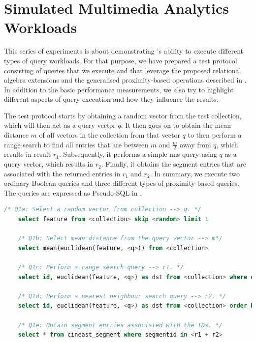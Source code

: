 \section{Simulated Multimedia Analytics Workloads}
\label{section:evaluation_analytics}

This series of experiments is about demonstrating \cottontail{}'s ability to execute different types of query workloads. For that purpose, we have prepared a test protocol consisting of queries that we execute and that leverage the proposed relational algebra extensions and the generalised proximity-based operations described in . In addition to the basic performance measurements, we also try to highlight different aspects of query execution and how they influence the results.

The test protocol starts by obtaining a random vector from the test collection, which will then act as a query vector $q$. It then goes on to obtain the mean distance $m$ of all vectors in the collection from that vector $q$ to then perform a range search to find all entries that are between $m$ and $\frac{m}{2}$ away from $q$, which results in result $r_1{}$. Subsequently, it performs a simple \acrshort{nns} query using $q$ as a query vector, which results in $r_2$. Finally, it obtains the segment entries that are associated with the returned entries in $r_1$ and $r_2$. In summary, we execute two ordinary Boolean queries and three different types of proximity-based queries. The queries are expressed as Pseudo-SQL in .

\begin{lstlisting}[language=SQL, caption={Pseudo-SQL of the queries executed for the analytics workload.}, label=listing:analytics_queries, numbers=none]
    /* Q1a: Select a random vector from collection --> q. */
    select feature from <collection> skip <random> limit 1
    
    /* Q1b: Select mean distance from the query vector --> m*/
    select mean(euclidean(feature, <q>)) from <collection> 

    /* Q1c: Perform a range search query --> r1. */
    select id, euclidean(feature, <q>) as dst from <collection> where dst BETWEEN (m/2.0, m) order by dst asc limit 1000

    /* Q1d: Perform a nearest neighbour search query --> r2. */
    select id, euclidean(feature, <q>) as dst from <collection> order by dst asc limit 1000

    /* Q1e: Obtain segment entries associated with the IDs. */
    select * from cineast_segment where segmentid in <r1 + r2>
\end{lstlisting}


